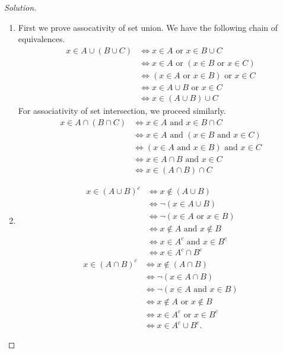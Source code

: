 \documentclass[12pt]{article}
\theoremstyle{definition}
\theoremstyle{plain}
\newenvironment{solution}
  {\begin{proof}[Solution]}
  {\end{proof}}
\newcommand{\Or}{\text{ or }}
\renewcommand{\And}{\text{ and }}
\begin{document}
\begin{enumerate}
\begin{solution}
\begin{enumerate}
	\item First we prove assocativity of set union. We have the following chain of equivalences.
		\begin{align*}
			x \in A \cup (B \cup C) &\iff x \in A  \Or  x \in B \cup C \\
			& \iff x \in A \Or (x \in B \Or x \in C)\\
			& \iff (x \in A \Or x \in B ) \Or x \in C\\
			& \iff x \in A \cup B \Or x \in C\\
			& \iff x \in (A \cup B) \cup C
		\end{align*}
		For associativity of set intersection, we proceed similarly.
		\begin{align*}
			x \in A \cap (B \cap C) &\iff x \in A  \And  x \in B \cap C \\
			& \iff x \in A \And (x \in B \And x \in C)\\
			& \iff (x \in A \And x \in B ) \And x \in C\\
			& \iff x \in A \cap B \And x \in C\\
			& \iff x \in (A \cap B) \cap C
		\end{align*}
		
	\item \begin{align*}
			x \in (A \cup B)^c & \iff x \notin (A \cup B)\\
			&\iff \neg (x \in A \cup B)\\
			&\iff \neg (x \in A \Or x \in B)\\
			&\iff x \notin A \And x \notin B\\
			&\iff x \in A^c \And x \in B^c\\
			&\iff x \in A^c \cap B^c
		\end{align*}
		\begin{align*}
			x \in (A \cap B)^c & \iff x \notin (A \cap B)\\
			&\iff \neg (x \in A \cap B)\\
			&\iff \neg (x \in A \And x \in B)\\
			&\iff x \notin A \Or x \notin B\\
			&\iff x \in A^c \Or x \in B^c\\
			&\iff x \in A^c \cup B^c.
		\end{align*}
	\end{enumerate}
	\end{solution}
	

\end{enumerate}
\end{document}
